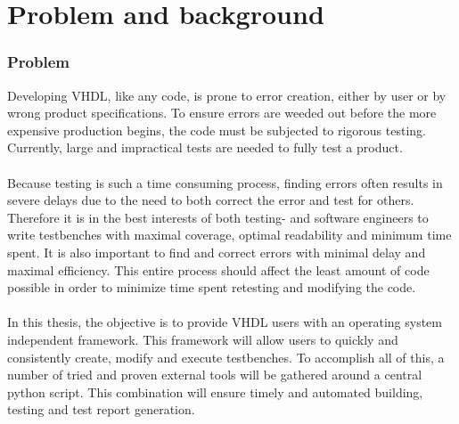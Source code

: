 \documentclass[11pt,british]{article}
\begin{document}
\printglossary[type=\acronymtype,title={List of Acronyms}]
\pagebreak

\part{Problem and background}
\renewcommand{\thepage}{\arabic{page}}
\setcounter{page}{1}


\section{Problem}

Developing \gls{VHDL}, like any code, is prone to error creation, either by user or by wrong product specifications. To ensure errors are weeded out before the more expensive production begins, the code must be subjected to rigorous testing. Currently, large and impractical tests are needed to fully test a product.
\\
\\
Because testing is such a time consuming process, finding errors often results in severe delays due to the need to both correct the error and test for others. Therefore it is in the best interests of both testing- and software engineers to write testbenches with maximal coverage, optimal readability and minimum time spent. It is also important to find and correct errors with minimal delay and maximal efficiency. This entire process should affect the least amount of code possible in order to minimize time spent retesting and modifying the code.
\\
\\
In this thesis, the objective is to provide VHDL users with an operating system independent framework. This framework will allow users to quickly and consistently create, modify and execute testbenches. To accomplish all of this, a number of tried and proven external tools will be gathered around a central python script. This combination will ensure timely and automated building, testing and test report generation.

\end{document}
